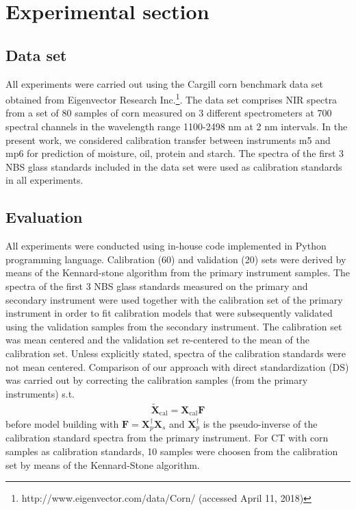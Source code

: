 \documentclass{article}
\let\vec\mathbf
\begin{document}
\section{Experimental section}
\subsection{Data set}
 All experiments were carried out using the Cargill corn benchmark data set obtained from Eigenvector Research Inc.\footnote{http://www.eigenvector.com/data/Corn/ (accessed April 11, 2018)}. The data set comprises NIR spectra from a set of 80 samples of corn measured on 3 different spectrometers at 700 spectral channels in the wavelength range 1100-2498 nm at 2 nm intervals. In the present work, we considered calibration transfer between instruments m5 and mp6 for prediction
 of moisture, oil, protein and starch. The spectra of the first 3 NBS glass standards included in the data set were used as calibration standards in all experiments.
 
\subsection{Evaluation}
All experiments were conducted using in-house code implemented in Python programming language. Calibration (60) and validation (20) sets were derived by means of the Kennard-stone algorithm \cite{doi:10.1080/00401706.1969.10490666} from the primary instrument samples. The spectra of the first 3 NBS glass standards measured on the primary and secondary instrument were used together with the calibration set of the primary instrument in order to fit calibration models that were subsequently validated using the validation samples from the secondary instrument. The calibration set was mean centered and the validation set re-centered to the mean of the calibration set. Unless explicitly stated, spectra of the calibration standards were not mean centered. Comparison of our approach with direct standardization (DS)  was carried out by correcting the calibration samples (from the primary instruments) s.t.
\begin{align}
\tilde{\vec{X}}_{\text{cal}} = \vec{X}_{\text{cal}}\vec F
\end{align}
before model building with $\vec F = \vec X_p^\dagger\vec X_s$ and $\vec X_p^\dagger$ is the pseudo-inverse of the calibration standard spectra from the primary instrument. For CT with corn samples as calibration standards, 10 samples were choosen from the calibration set by means of the Kennard-Stone algorithm.
\end{document}
